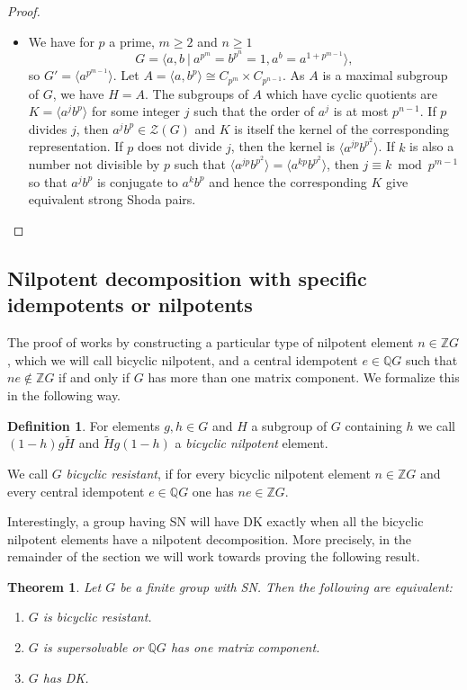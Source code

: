 \documentclass[a4paper,10pt]{amsart}
\newtheorem{theorem}[lemma]{Theorem}
\theoremstyle{definition}
\newtheorem{definition}[lemma]{Definition}
\theoremstyle{remark}
\newcommand{\ZZ}{\mathcal{Z}}
\newcommand{\Q}{{\mathbb Q}}
\begin{document}
\begin{proof}
\begin{itemize}
\item[(BJ1)] We have for $p$ a prime, $m\geq 2$ and $n\geq 1$
\[G = \langle a,b \ | \ a^{p^m} = b^{p^n} = 1, a^b = a^{1+p^{m-1}} \rangle, \]
so $G' = \langle a^{p^{m-1}} \rangle$. Let $A = \langle a, b^p \rangle \cong C_{p^m} \times C_{p^{n-1}}$. As $A$ is a maximal subgroup of $G$, we have $H=A$. The  subgroups of $A$ which have cyclic quotients are $K = \langle a^jb^p \rangle$ for some integer $j$ such that the order of $a^j$ is at most $p^{n-1}$. If $p$ divides $j$, then $a^jb^p \in \ZZ(G)$ and $K$ is itself the kernel of the corresponding representation. If $p$ does not divide $j$, then the kernel is $\langle a^{jp}b^{p^2} \rangle$. If $k$ is also a number not divisible by $p$ such that $\langle a^{jp}b^{p^2} \rangle = \langle a^{kp}b^{p^2} \rangle$, then $j \equiv k \bmod p^{m-1}$ so that $a^jb^p$ is conjugate to $a^kb^p$ and hence the corresponding $K$ give equivalent strong Shoda pairs.
\end{itemize}
\end{proof}


\subsection{Nilpotent decomposition with specific idempotents or nilpotents}\label{subsection on SN versus DK}

The proof of  works by constructing a particular type of nilpotent element $n \in \mathbb{Z}G$, which we will call bicyclic nilpotent, and a central idempotent $e \in \Q G$ such that $ne \notin \mathbb{Z}G$ if and only if $G$ has more than one matrix component. We formalize this in the following way.

\begin{definition}
For elements $g,h \in G$ and $H$ a subgroup of $G$ containing $h$ we call $(1-h)g\widetilde{H}$ and $\widetilde{H}g(1-h)$ a \emph{bicyclic nilpotent} element.

We call $G$ \emph{bicyclic resistant}, if for every bicyclic nilpotent element $n \in \mathbb{Z}G$ and every central idempotent $e \in \Q G$ one has $ne \in \mathbb{Z}G$.
\end{definition}

Interestingly, a group having SN will have DK exactly when all the bicyclic nilpotent elements have a nilpotent decomposition. More precisely, in the remainder of the section we will work towards proving the following result. 

\begin{theorem}\label{When SN is DK theorem}
Let $G$ be a finite group with SN. Then the following are equivalent:
\begin{enumerate}
\item $G$ is bicyclic resistant.
\item $G$ is supersolvable or $\Q G$ has one matrix component.
\item $G$ has DK.
\end{enumerate}
\end{theorem}
\end{document}
